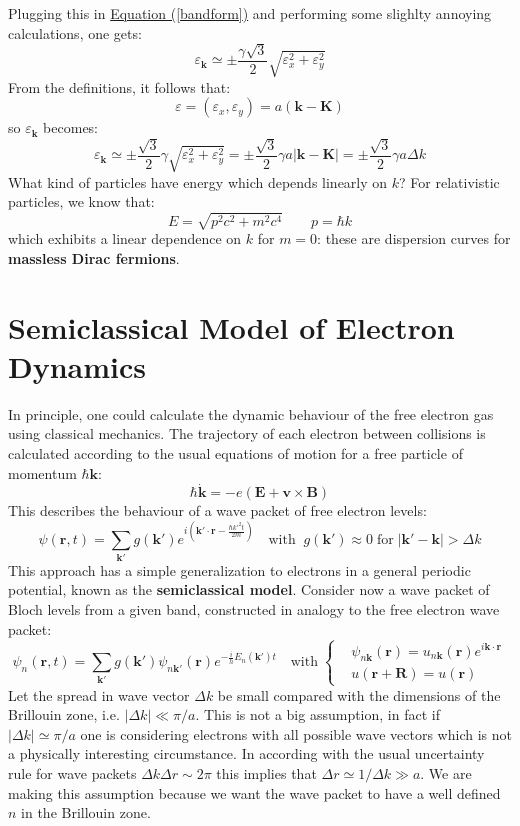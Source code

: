 \documentclass[10.75pt,a4paper,openright,bottom=2cm]{article}
\renewcommand{\Vec}[1]{\boldsymbol{#1}}
\renewcommand{\refeq}[1]{\hyperref[#1]{Equation (\ref{#1})}}
\begin{document}
Plugging this in \refeq{bandform} and performing some slighlty annoying calculations, one gets:
\[
\varepsilon_{\Vec{k}}\simeq\pm\frac{\gamma\sqrt{3}}{2}\sqrt{\varepsilon_x^2+\varepsilon_y^2}
\]
From the definitions, it follows that:
\[
\varepsilon=(\varepsilon_x,\varepsilon_y)=a(\Vec{k}-\Vec{K})
\]
so $\varepsilon_{\Vec{k}}$ becomes:
\[
\varepsilon_{\Vec{k}}\simeq\pm\frac{\sqrt{3}}{2}\gamma\sqrt{\varepsilon_x^2+\varepsilon_y^2}=\pm\frac{\sqrt{3}}{2}\gamma a|\Vec{k}-\Vec{K}|=\pm\frac{\sqrt{3}}{2}\gamma a\Delta k
\]
What kind of particles have energy which depends linearly on $k$? For relativistic particles, we know that:
\[
E=\sqrt{p^2c^2+m^2c^4} \qquad p=\hbar k
\]
which exhibits a linear dependence on $k$ for $m=0$: these are dispersion curves for \textbf{massless Dirac fermions}.
\newpage
\section{Semiclassical Model of Electron Dynamics}
In principle, one could calculate the dynamic behaviour of the free electron gas using classical mechanics. The trajectory of each electron between collisions is calculated according to the usual equations of motion for a free particle of momentum $\hbar\Vec{k}$:
\begin{equation}
\label{eqmot1}
\hbar\Vec{\Dot{k}}=-e(\Vec{E}+\Vec{v}\times\Vec{B}) %
\end{equation}
This describes the behaviour of a wave packet of free electron levels:
\[
\psi(\Vec{r},t)=\sum_{\Vec{k'}}g(\Vec{k'})e^{i\left(\Vec{k'}\cdot\Vec{r}-\frac{\hbar k'^2t}{2m}\right)} \quad \text{with}\;\;g(\Vec{k'})\approx0\;\text{for}\;|\Vec{k'}-\Vec{k}|>\Delta k
\]
This approach has a simple generalization to electrons in a general periodic potential, known as the \textbf{semiclassical model}. Consider now a wave packet of Bloch levels from a given band, constructed in analogy to the free electron wave packet:
\[
\psi_n(\Vec{r},t)=\sum_{\Vec{k'}}g(\Vec{k'})\psi_{n\Vec{k'}}(\Vec{r})e^{-\frac{i}{h}E_n(\Vec{k'})t} \quad \text{with}\;
\left\{
\begin{aligned}
&\psi_{n\Vec{k}}(\Vec{r})=u_{n\Vec{k}}(\Vec{r})e^{i\Vec{k}\cdot\Vec{r}}\\
&u(\Vec{r}+\Vec{R})=u(\Vec{r})
\end{aligned}
\right.
\]
Let the spread in wave vector $\Delta k$ be small compared with the dimensions of the Brillouin zone, i.e. $|\Delta k|\ll\pi/a$. This is not a big assumption, in fact if $|\Delta k|\simeq\pi/a$ one is considering electrons with all possible wave vectors which is not a physically interesting circumstance. In according with the usual uncertainty rule for wave packets $\Delta k\Delta r\sim2\pi$ this implies that $\Delta r\simeq1/\Delta k\gg a$. We are making this assumption because we want the wave packet to have a well defined $n$ in the  Brillouin zone.\\
\end{document}
